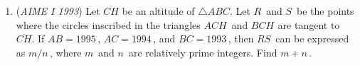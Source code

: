 \begin{enumerate}
 

	\item (\textit{AIME I 1993}) Let $\overline{CH}$ be an altitude of $\triangle ABC$. Let $R\,$ and $S\,$ be the points where the circles inscribed in the triangles $ACH\,$ and $BCH^{}_{}$ are tangent to $\overline{CH}$. If $AB = 1995\,$, $AC = 1994\,$, and $BC = 1993\,$, then $RS\,$ can be expressed as $m/n\,$, where $m\,$ and $n\,$ are relatively prime integers. Find $m + n\,$.


 

\end{enumerate}